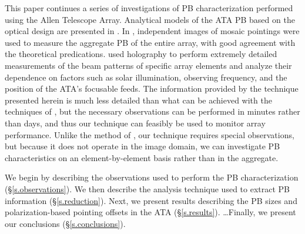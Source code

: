 \documentclass[preprint]{aastex}
\begin{document}
This paper continues a series of investigations of PB characterization
performed using the Allen Telescope Array. Analytical models of the
ATA PB based on the optical design are presented in \citet{wd04}. In
\citet{Hull2010}, independent images of mosaic pointings were used to
measure the aggregate PB of the entire array, with good agreement with
the theoretical predications. \citet{Harp2011} used holography to
perform extremely detailed measurements of the beam patterns of
specific array elements and analyze their dependence on factors such
as solar illumination, observing frequency, and the position of the
ATA's focusable feeds. The information provided by the technique
presented herein is much less detailed than what can be achieved with
the techniques of \citet{Harp2011}, but the necessary observations can
be performed in minutes rather than days, and thus our technique can
feasibly be used to monitor array performance. Unlike the method of
\citet{Hull2010}, our technique requires special observations, but
because it does not operate in the image domain, we can investigate PB
characteristics on an element-by-element basis rather than in the
aggregate.

We begin by describing the observations used to perform the PB
characterization (\S\ref{s.observations}). We then describe the
analysis technique used to extract PB information
(\S\ref{s.reduction}). Next, we present results describing the PB
sizes and polarization-based pointing offsets in the ATA
(\S\ref{s.results}). \ldots Finally, we present our conclusions
(\S\ref{s.conclusions}).

\end{document}
